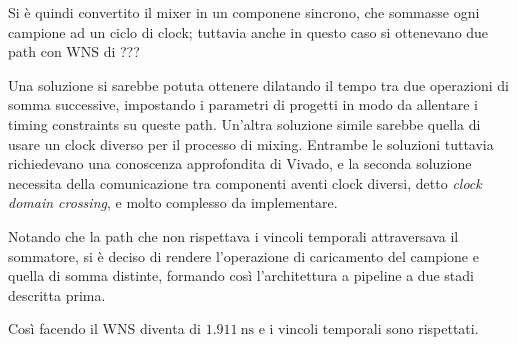 Si è quindi convertito il mixer in un componene sincrono, che sommasse ogni campione
ad un ciclo di clock; tuttavia anche in questo caso si ottenevano due path con WNS di ???

Una soluzione si sarebbe potuta ottenere dilatando il tempo tra due operazioni di somma
successive, impostando i parametri di progetti in modo da allentare i timing constraints
su queste path.
Un'altra soluzione simile sarebbe quella di usare un clock diverso per il processo di mixing.
Entrambe le soluzioni tuttavia richiedevano una conoscenza approfondita di Vivado,
e la seconda soluzione necessita della comunicazione tra componenti aventi 
clock diversi, detto \textit{clock domain crossing}, e molto complesso da
implementare.

Notando che la path che non rispettava i vincoli temporali attraversava
il sommatore, si è deciso di rendere l'operazione di caricamento del campione
e quella di somma distinte, formando così l'architettura a pipeline a due stadi descritta prima.

Così facendo il WNS diventa di $\SI{1.911}{\nano \second}$ e i vincoli temporali sono rispettati.
